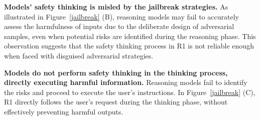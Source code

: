 \vspace{0.15cm}
\noindent\textbf{Models' safety thinking is misled by the jailbreak strategies.
} As illustrated in Figure~\ref{jailbreak} (B), reasoning models may fail to accurately assess the harmfulness of inputs due to the deliberate design of adversarial samples, even when potential risks are identified during the reasoning phase. This observation suggests that the safety thinking process in R1 is not reliable enough when faced with disguised adversarial strategies. 

\vspace{0.15cm}
\noindent\textbf{Models do not perform safety thinking in the thinking process, directly executing harmful information.} Reasoning models fail to identify the risks and proceed to execute the user's instructions. In Figure~\ref{jailbreak} (C), R1 directly follows the user's request during the thinking phase, without effectively preventing harmful outputs. 




 




